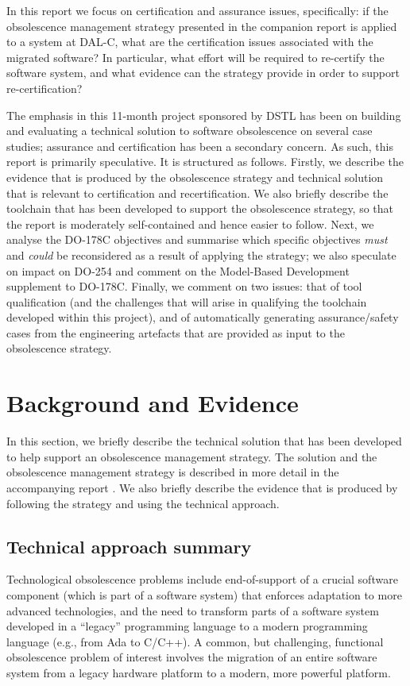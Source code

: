 \documentclass{llncs}
\begin{document}
In this report we focus on certification and assurance issues, specifically: if the obsolescence management strategy
presented in the companion report is applied to a system at DAL-C, what are the certification issues associated with
the migrated software? In particular, what effort will be required to re-certify the software system, and what evidence
can the strategy provide in order to support re-certification?

The emphasis in this 11-month project sponsored by DSTL has been on building and evaluating a technical solution to
software obsolescence on several case studies; assurance and certification has been a secondary concern. As such, this
report is primarily speculative. It is structured as follows. Firstly, we describe the evidence that is produced by the 
obsolescence strategy and technical solution that is relevant to certification and recertification. We also briefly describe
the toolchain that has been developed to support the obsolescence strategy, so that the report is moderately self-contained
and hence easier to follow. Next, we analyse the DO-178C objectives and summarise which specific objectives \textit{must} and
\textit{could} be reconsidered as a result of applying the strategy; we also speculate on impact on DO-254 and comment on the Model-Based Development supplement to DO-178C. Finally, we comment on two issues: that of tool qualification
(and the challenges that will arise in qualifying the toolchain developed within this project), and of automatically generating 
assurance/safety cases from the engineering artefacts that are provided as input to the obsolescence strategy.

\section{Background and Evidence}
In this section, we briefly describe the technical solution that has been developed to help support an obsolescence management
strategy. The solution and the obsolescence management strategy is described in more detail in the accompanying report \cite{Gerasimou2017}. 
We also briefly describe the evidence that is produced by following the strategy and using the technical approach.

\subsection{Technical approach summary}
Technological obsolescence problems
include end-of-support of a crucial software component (which is part of a 
software system) that enforces adaptation to more advanced technologies, and 
the 
need to transform parts of a software system developed in a ``legacy'' 
programming language to a modern programming language (e.g., from Ada to 
C/C++). 
A common, but challenging, functional obsolescence problem  of interest 
involves the migration of an entire software system from a legacy hardware 
platform to a modern, more powerful platform.
\end{document}
